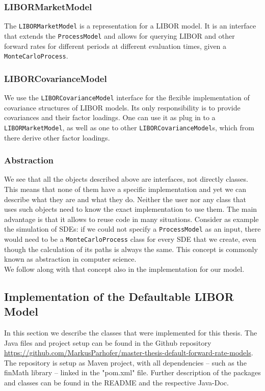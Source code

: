 \documentclass[12pt]{article}
\begin{document}
	\subsubsection*{LIBORMarketModel}
	The \texttt{LIBORMarketModel} is a representation for a LIBOR model. It is an interface that extends the \texttt{ProcessModel} and allows for querying LIBOR and other forward rates for different periods at different evaluation times, given a \texttt{MonteCarloProcess}.
	
	
	\subsubsection*{LIBORCovarianceModel}
	We use the \texttt{LIBORCovarianceModel} interface for the flexible implementation of covariance structures of LIBOR models. Its only responsibility is to provide covariances and their factor loadings. One can use it as plug in to a \texttt{LIBORMarketModel}, as well as one to other \texttt{LIBORCovarianceModel}s, which from there derive other factor loadings.
	
	
	\subsubsection*{Abstraction}
	We see that all the objects described above are interfaces, not directly classes.
	This means that none of them have a specific implementation and yet we can describe what they are and what they do. Neither the user nor any class that uses such objects need to know the exact implementation to use them. The main advantage is that it allows to reuse code in many situations. Consider as example the simulation of SDEs: if we could not specify a \texttt{ProcessModel} as an input, there would need to be a \texttt{MonteCarloProcess} class for every SDE that we create, even though the calculation of its paths is always the same. This concept is commonly known as abstraction in computer science.\\
	We follow along with that concept also in the implementation for our model.
	
	
	
	\subsection{Implementation of the Defaultable LIBOR Model}
	In this section we describe the classes that were implemented for this thesis. The Java files and project setup can be found in the Github repository \url{https://github.com/MarkusParhofer/master-thesis-default-forward-rate-models}. The repository is setup as Maven project, with all dependencies -- such as the finMath library -- linked in the "pom.xml" file. Further description of the packages and classes can be found in the README and the respective Java-Doc.
	
\end{document}
